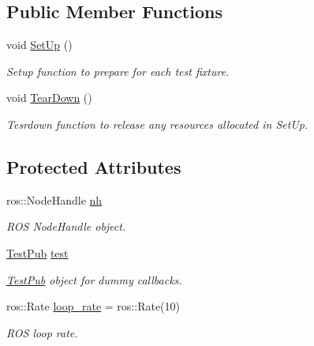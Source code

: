 \subsection*{Public Member Functions}
\begin{DoxyCompactItemize}
\item 
void \hyperlink{classExplorerTest_a27a0935c02df6b7bab2bf84e59987a23}{Set\+Up} ()
\begin{DoxyCompactList}\small\item\em Setup function to prepare for each test fixture. \end{DoxyCompactList}\item 
void \hyperlink{classExplorerTest_a8a9ee07a126a1113725f7ed9ea61743f}{Tear\+Down} ()
\begin{DoxyCompactList}\small\item\em Tesrdown function to release any resources allocated in Set\+Up. \end{DoxyCompactList}\end{DoxyCompactItemize}
\subsection*{Protected Attributes}
\begin{DoxyCompactItemize}
\item 
ros\+::\+Node\+Handle \hyperlink{classExplorerTest_a7474ee5196fc4d9017417c3e6511b792}{nh}\hypertarget{classExplorerTest_a7474ee5196fc4d9017417c3e6511b792}{}\label{classExplorerTest_a7474ee5196fc4d9017417c3e6511b792}

\begin{DoxyCompactList}\small\item\em R\+OS Node\+Handle object. \end{DoxyCompactList}\item 
\hyperlink{classTestPub}{Test\+Pub} \hyperlink{classExplorerTest_a5b31f4a2740df7e24805c723b3865d7c}{test}\hypertarget{classExplorerTest_a5b31f4a2740df7e24805c723b3865d7c}{}\label{classExplorerTest_a5b31f4a2740df7e24805c723b3865d7c}

\begin{DoxyCompactList}\small\item\em \hyperlink{classTestPub}{Test\+Pub} object for dummy callbacks. \end{DoxyCompactList}\item 
ros\+::\+Rate \hyperlink{classExplorerTest_a942ab410cdbff899ffbcc96f55777397}{loop\+\_\+rate} = ros\+::\+Rate(10)\hypertarget{classExplorerTest_a942ab410cdbff899ffbcc96f55777397}{}\label{classExplorerTest_a942ab410cdbff899ffbcc96f55777397}

\begin{DoxyCompactList}\small\item\em R\+OS loop rate. \end{DoxyCompactList}\end{DoxyCompactItemize}


